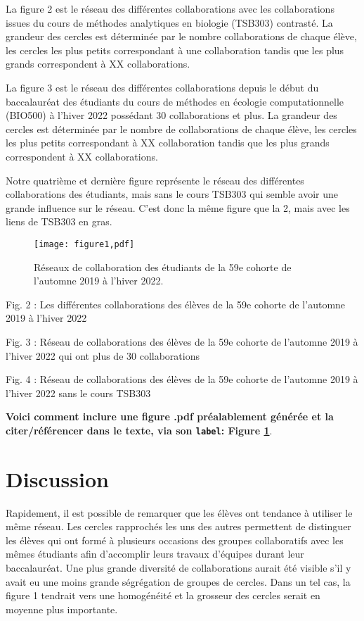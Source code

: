 \documentclass[9pt,twocolumn,twoside,]{pnas-new}
\begin{document}
La figure 2 est le réseau des différentes collaborations avec les
collaborations issues du cours de méthodes analytiques en biologie
(TSB303) contrasté. La grandeur des cercles est déterminée par le nombre
collaborations de chaque élève, les cercles les plus petits
correspondant à une collaboration tandis que les plus grands
correspondent à XX collaborations.

La figure 3 est le réseau des différentes collaborations depuis le début
du baccalauréat des étudiants du cours de méthodes en écologie
computationnelle (BIO500) à l'hiver 2022 possédant 30 collaborations et
plus. La grandeur des cercles est déterminée par le nombre de
collaborations de chaque élève, les cercles les plus petits
correspondant à XX collaboration tandis que les plus grands
correspondent à XX collaborations.

Notre quatrième et dernière figure représente le réseau des différentes
collaborations des étudiants, mais sans le cours TSB303 qui semble avoir
une grande influence sur le réseau. C'est donc la même figure que la 2,
mais avec les liens de TSB303 en gras.

\begin{figure}
\centering
\texttt{[image: figure1,pdf]}
\caption{Réseaux de collaboration des étudiants de la 59e cohorte de
l'automne 2019 à l'hiver 2022. \label{fig:plot1}}
\end{figure}

Fig. 2 : Les différentes collaborations des élèves de la 59e cohorte de
l'automne 2019 à l'hiver 2022

Fig. 3 : Réseau de collaborations des élèves de la 59e cohorte de
l'automne 2019 à l'hiver 2022 qui ont plus de 30 collaborations

Fig. 4 : Réseau de collaborations des élèves de la 59e cohorte de
l'automne 2019 à l'hiver 2022 sans le cours TSB303

\textbf{Voici comment inclure une figure .pdf préalablement générée et
la citer/référencer dans le texte, via son \texttt{label}: Figure
\ref{fig:plot1}}.

\hypertarget{discussion}{%
\section{Discussion}\label{discussion}}

Rapidement, il est possible de remarquer que les élèves ont tendance à
utiliser le même réseau. Les cercles rapprochés les uns des autres
permettent de distinguer les élèves qui ont formé à plusieurs occasions
des groupes collaboratifs avec les mêmes étudiants afin d'accomplir
leurs travaux d'équipes durant leur baccalauréat. Une plus grande
diversité de collaborations aurait été visible s'il y avait eu une moins
grande ségrégation de groupes de cercles. Dans un tel cas, la figure 1
tendrait vers une homogénéité et la grosseur des cercles serait en
moyenne plus importante.
\end{document}
